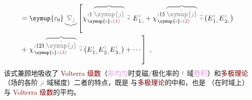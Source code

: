 \begin{subequations}
\begin{align}
	&\hphantom{:}= {\symup{\varepsilon_0}} \mathcolor{gray}{\underbrace{\nabla_{\check{\jmath}}}} \left[ \chi^{\;\! \mathcolor{gray}{t} \hat{1} \;\! \mathcolor{gray}{\overbrace{\check{\symup{\jmath}}}}}_{\;\! \symup{\iota} \mathcolor{gray}{z} \textcolor{Maroon}{(1)}} ~\mathcolor{gray}{\widetilde *}~ E^{\;\!\mathcolor{gray}{t}}_{\;\! \hat{1} \mathcolor{gray}{z}} + \chi^{\;\! \mathcolor{gray}{t} \hat{1} \hat{2} \;\! \mathcolor{gray}{\overbrace{\check{\symup{\jmath}}}}}_{\;\! \symup{\iota} \mathcolor{gray}{z} \textcolor{Maroon}{(2)}} ~\mathcolor{gray}{\widetilde *} \left( E^{\;\!\mathcolor{gray}{t}}_{\;\! \hat{1} \mathcolor{gray}{z}} E^{\;\!\mathcolor{gray}{t}}_{\;\! \hat{2} \mathcolor{gray}{z}} \right) \right. \label{eq:D_trho2} \\ &\hphantom{:}+ \left. \chi^{\;\! \mathcolor{gray}{t} \hat{1} \hat{2} \hat{3} \;\! \mathcolor{gray}{\overbrace{\check{\symup{\jmath}}}}}_{\;\! \symup{\iota} \mathcolor{gray}{z} \textcolor{Maroon}{(3)}} ~\mathcolor{gray}{\widetilde *} \left( E^{\;\!\mathcolor{gray}{t}}_{\;\! \hat{1} \mathcolor{gray}{z}} E^{\;\!\mathcolor{gray}{t}}_{\;\! \hat{2} \mathcolor{gray}{z}} E^{\;\!\mathcolor{gray}{t}}_{\;\! \hat{3} \mathcolor{gray}{z}} \right) + \cdots \right]~,
\end{align}
\end{subequations}
该式兼顾地吸收了 \textcolor{Maroon}{Volterra 级数}（\textcolor{Plum}{非均匀}时变磁/极化率的 $\mathcolor{gray}{t}$ 域\textcolor{Plum}{卷积}）和\textcolor{Maroon}{多极理论}（场的各阶 $\mathcolor{gray}{\bar{\rho}}$ 域梯度）二者的特点，既是  与\textcolor{Maroon}{多极理论}的中和，也是 （在时域上）与 \textcolor{Maroon}{Volterra 级数}的平均。

